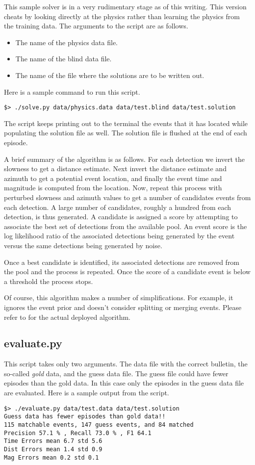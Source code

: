 \documentclass[12pt,letterpaper,onecolumn,oneside]{article}
\begin{document}
\begin{appendices}
This sample solver is in a very rudimentary stage as of this
writing. This version cheats by looking directly at the physics rather
than learning the physics from the training data. The arguments to the
script are as follows.
\begin{itemize}
\item The name of the physics data file.
\item The name of the blind data file.
\item The name of the file where the solutions are to be written out.
\end{itemize}
Here is a sample
command to run this script.
\begin{verbatim}
$> ./solve.py data/physics.data data/test.blind data/test.solution
\end{verbatim}
The script keeps printing out to the terminal the events that it has
located while populating the solution file as well. The solution file is
flushed at the end of each episode.

A brief summary of the algorithm is as follows. For each detection we
invert the slowness to get a distance estimate. Next invert the distance
estimate and azimuth to get a potential event location, and finally the
event time and magnitude is computed from the location. Now, repeat this
process with perturbed slowness and azimuth values to get a number of
candidates events from each detection. A large number of candidates, roughly a
hundred from each detection, is thus generated. A candidate is assigned
a score by attempting to associate the best set of detections from the
available pool. An event score is the log likelihood ratio of the
associated detections being generated by the event versus the same
detections being generated by noise.

Once a best candidate is identified, its associated detections are
removed from the pool and the process is repeated. Once the score of a
candidate event is below a threshold the process stops.

Of course, this algorithm makes a number of simplifications. For example,
it ignores the event prior and doesn't consider splitting or merging
events. Please refer to \cite{Arora2013} for the actual deployed
algorithm.

\subsection{evaluate.py}
This script takes only two arguments. The data file with the correct
bulletin, the so-called {\em gold} data, and the guess data file. The
guess file could have fewer episodes than the gold data. In this case
only the episodes in the guess data file are evaluated. Here is a sample
output from the script.
\begin{lstlisting}
$> ./evaluate.py data/test.data data/test.solution 
Guess data has fewer episodes than gold data!!
115 matchable events, 147 guess events, and 84 matched
Precision 57.1 % , Recall 73.0 % , F1 64.1
Time Errors mean 6.7 std 5.6
Dist Errors mean 1.4 std 0.9
Mag Errors mean 0.2 std 0.1
\end{lstlisting}


\end{appendices}
\end{document}
